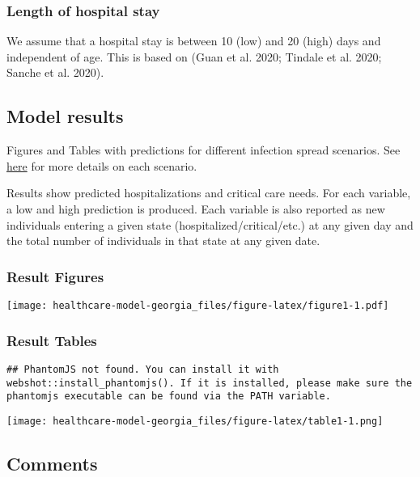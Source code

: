 \documentclass[
]{article}
\begin{document}
\hypertarget{length-of-hospital-stay}{%
\subsubsection{Length of hospital stay}\label{length-of-hospital-stay}}

We assume that a hospital stay is between 10 (low) and 20 (high) days
and independent of age. This is based on (Guan et al. 2020; Tindale et
al. 2020; Sanche et al. 2020).

\hypertarget{model-results}{%
\subsection{Model results}\label{model-results}}

Figures and Tables with predictions for different infection spread
scenarios. See
\href{http://2019-coronavirus-tracker.com/stochastic-GA.html}{here} for
more details on each scenario.

Results show predicted hospitalizations and critical care needs. For
each variable, a low and high prediction is produced. Each variable is
also reported as new individuals entering a given state
(hospitalized/critical/etc.) at any given day and the total number of
individuals in that state at any given date.

\hypertarget{result-figures}{%
\subsubsection{Result Figures}\label{result-figures}}

\texttt{[image: healthcare-model-georgia\_files/figure-latex/figure1-1.pdf]}

\hypertarget{result-tables}{%
\subsubsection{Result Tables}\label{result-tables}}

\begin{verbatim}
## PhantomJS not found. You can install it with webshot::install_phantomjs(). If it is installed, please make sure the phantomjs executable can be found via the PATH variable.
\end{verbatim}

\texttt{[image: healthcare-model-georgia\_files/figure-latex/table1-1.png]}

\hypertarget{comments}{%
\subsection{Comments}\label{comments}}
\end{document}
